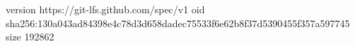 version https://git-lfs.github.com/spec/v1
oid sha256:130a043ad84398e4c78d3d658dadec75533f6e62b8f37d5390455f357a597745
size 192862
